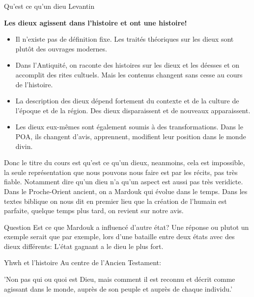 \begin{parag}{Qu'est ce qu'un dieu Levantin}
   \begin{center}
      \textbf{Les dieux agissent dans l'histoire et ont une histoire!} 
   \end{center}
   \begin{itemize}
		\item Il n'existe pas de définition fixe. Les traités théoriques sur les dieux sont plutôt des ouvrages modernes.
		\item  Dans l'Antiquité, on raconte des histoires sur les dieux et les déesses et on accomplit des rites cultuels. Mais les contenus changent sans cesse au cours de l'histoire.
		\item  La description des dieux dépend fortement du contexte et de la culture de l'époque et de la région. Des dieux disparaissent et de nouveaux apparaissent.
		\item  Les dieux eux-mêmes sont également soumis à des transformations. Dans le POA, ils changent d'avis, apprennent, modifient leur position dans le monde divin.
   \end{itemize}
   \begin{framedremark}
   Donc le titre du cours est qu'est ce qu'un dieux, neanmoins, cela est impossible, la seule représentation que nous pouvons nous faire est par les récits, pas très fiable. Notamment dire qu'un dieu n'a qu'un aspect est aussi pas très veridicte. Dans le Proche-Orient ancient, on a Mardouk qui évolue dans le temps. Dans les textes biblique on nous dit en premier lieu que la création de l'humain est parfaite, quelque temps plus tard, on revient sur notre avis.
   \end{framedremark}
   \begin{subparag}{Question}
       Est ce que Mardouk a influencé d'autre état? Une réponse ou plutot un exemple serait que par exemple, lors d'une bataille entre deux états avec des dieux différents: L'état gagnant a le dieu le plus fort.
   \end{subparag}
\end{parag}
\begin{parag}{Yhwh et l'histoire}
    Au centre de l'Ancien Testament:
	\begin{center}
	    'Non pas qui ou quoi est Dieu, mais comment il est reconnu et décrit comme agissant dans le monde, auprès de son peuple et auprès de chaque individu.'
	\end{center}
	
\end{parag}

